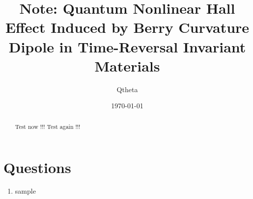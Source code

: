 \documentclass[]{article}
\begin{document}

\title{Note: Quantum Nonlinear Hall Effect Induced by Berry Curvature Dipole in Time-Reversal Invariant Materials}
\author{Qtheta}
\date{\today}

\maketitle

\tableofcontents
\newpage

\begin{abstract}
Test now !!!
Test again !!!

\end{abstract}
\section{Questions}
\begin{enumerate}
    \item sample

\end{enumerate}

\end{document}
